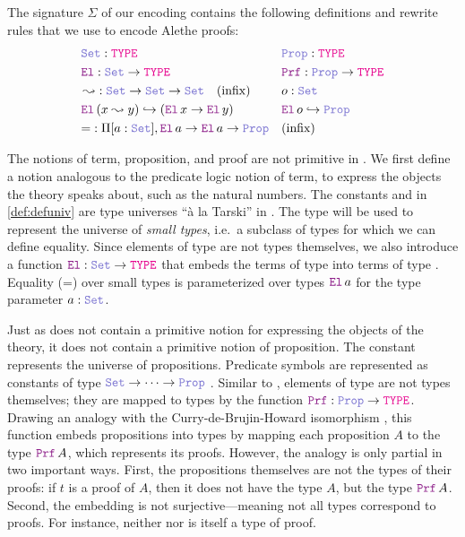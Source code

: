 \begin{definition}
\label{def:defuniv}
The signature $\Sigma$ of our encoding contains the following definitions and rewrite rules that we use to encode Alethe proofs:
\begin{align*}
&\set\index{\set}: \type & &\prop\index{\prop}: \type \\
&\index{\el{}} \el{}: \set \rightarrow \type  & &\index{\prf}\prf{} : \prop \rightarrow \type \\
&\mathop{\leadsto}\index{$\leadsto$}: \set \rightarrow \set \rightarrow \set \quad \text{(infix)} & &o: \set \\
&\el\,(x \leadsto y) \hookrightarrow (\el\,x \rightarrow \el\,y) & &\el\,o\index{o}  \hookrightarrow \prop \\
& {=} \index{$=$} : \Pi [a : \set], \el\, a \ra \el\, a \ra \prop & & \text{(inﬁx)}
\end{align*}
\end{definition}

The notions of term, proposition, and proof are not primitive in \lpm.
We ﬁrst deﬁne a notion analogous to the predicate logic notion of term, to express the objects the theory speaks about, such as the natural numbers.
The constants \set{} and \prop{} in \cref{def:defuniv} are type universes  ``à la Tarski'' \cite[\S Universes]{intuitype} in \lpm.
The type \set{} will be used to represent the universe of \textit{small types}, i.e.\ a subclass of types for which we can define equality.
Since elements of type \set{} are not types themselves,
we also introduce a function $\el: \set \rightarrow \type$ that embeds the terms of type \set{} into terms of type \type.
Equality (=) over small types is parameterized over types $\el\,a$ for the type parameter $a : \set{}$.

Just as \lpm{} does not contain a primitive notion for expressing the objects of the theory, it does not contain a primitive notion of proposition.
The constant \prop{} represents the universe of propositions. Predicate symbols are represented as constants of type $\set{} \ra \dots \ra \prop$ .
Similar to \set{}, elements of type \prop{} are not types themselves; they are mapped to types by the function $\prf{}: \prop \rightarrow \type$.
Drawing an analogy with the Curry-de-Brujin-Howard isomorphism \cite{curryhoward}, this function embeds propositions into types by mapping each proposition $A$ to the type $\prf\,A$, which represents its proofs.
However, the analogy is only partial in two important ways. First, the propositions themselves are not the types of their proofs: if $t$ is a proof of $A$, then it does not have the type $A$,
but the type $\prf\,A$. Second, the embedding is not surjective—meaning not all types correspond to proofs. For instance, neither \set{} nor \prop{} is itself a type of proof.

